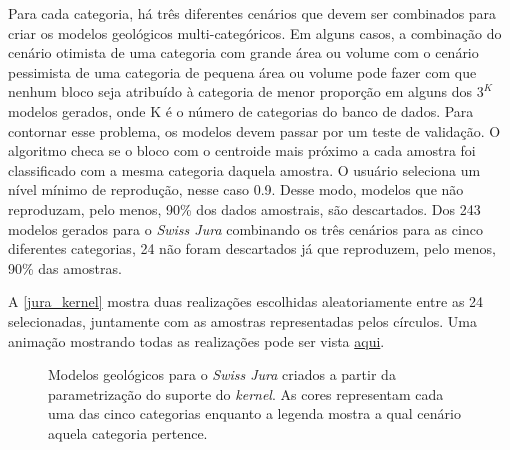 Para cada categoria, há três diferentes cenários que devem ser combinados para criar os modelos geológicos multi-categóricos. Em alguns casos, a combinação do cenário otimista de uma categoria com grande área ou volume com o cenário pessimista de uma categoria de pequena área ou volume pode fazer com que nenhum bloco seja atribuído à categoria de menor proporção em alguns dos $3^K$ modelos gerados, onde K é o número de categorias do banco de dados.  
Para contornar esse problema, os modelos devem passar por um teste de validação. O algoritmo checa se o bloco com o centroide mais próximo a cada amostra foi classificado com a mesma categoria daquela amostra. O usuário seleciona um nível mínimo de reprodução, nesse caso 0.9. Desse modo, modelos que não reproduzam, pelo menos, 90\% dos dados amostrais, são descartados. Dos 243 modelos gerados para o \textit{Swiss Jura} combinando os três cenários para as cinco diferentes categorias, 24 não foram descartados já que reproduzem, pelo menos, 90\% das amostras. 

A \autoref{jura_kernel} mostra duas realizações escolhidas aleatoriamente entre as 24 selecionadas, juntamente com as amostras representadas pelos círculos. Uma animação mostrando todas as realizações pode ser vista \href{https://github.com/robertorolo/kernel_support_parametrization_uncertainty_assess/blob/main/ezgif-7-b96e150c9939.gif}{aqui}.

\begin{figure}[H] 
    \centering
    \caption{Modelos geológicos para o \textit{Swiss Jura} criados a partir da parametrização do suporte do \textit{kernel}. As cores representam cada uma das cinco categorias enquanto a legenda mostra a qual cenário aquela categoria pertence.} \label{jura_kernel}
     \hspace{1em}
\end{figure}

